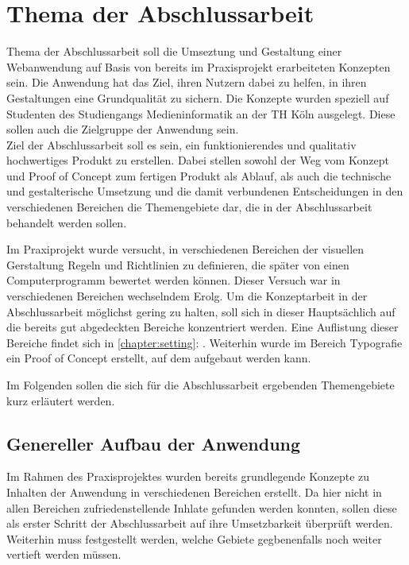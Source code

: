 \section{Thema der Abschlussarbeit}
Thema der Abschlussarbeit soll die Umseztung und Gestaltung einer Webanwendung auf Basis von bereits im Praxisprojekt erarbeiteten Konzepten sein.
Die Anwendung hat das Ziel, ihren Nutzern dabei zu helfen, in ihren Gestaltungen eine Grundqualität zu sichern. Die Konzepte wurden speziell auf Studenten des Studiengangs Medieninformatik an der TH Köln ausgelegt. Diese sollen auch die Zielgruppe der Anwendung sein. \\
Ziel der Abschlussarbeit soll es sein, ein funktionierendes und qualitativ hochwertiges Produkt zu erstellen.
Dabei stellen sowohl der Weg vom Konzept und Proof of Concept zum fertigen Produkt als Ablauf, als auch die technische und gestalterische Umsetzung und die damit verbundenen Entscheidungen in den verschiedenen Bereichen die Themengebiete dar, die in der Abschlussarbeit behandelt werden sollen.

Im Praxiprojekt wurde versucht, in verschiedenen Bereichen der visuellen Gerstaltung Regeln und Richtlinien zu definieren, die später von einen Computerprogramm bewertet werden können. Dieser Versuch war in verschiedenen Bereichen wechselndem Erolg. Um die Konzeptarbeit in der Abschlussarbeit möglichst gering zu halten, soll sich in dieser Hauptsächlich auf die bereits gut abgedeckten Bereiche konzentriert werden. Eine Auflistung dieser Bereiche findet sich in \autoref{chapter:setting}: \textit{}.
Weiterhin wurde im Bereich Typografie ein Proof of Concept erstellt, auf dem aufgebaut werden kann.

Im Folgenden sollen die sich für die Abschlussarbeit ergebenden Themengebiete kurz erläutert werden.

\subsection{Genereller Aufbau der Anwendung}
\label{chapter:setting}
Im Rahmen des Praxisprojektes wurden bereits grundlegende Konzepte zu Inhalten der Anwendung in verschiedenen Bereichen erstellt. Da hier nicht in allen Bereichen zufriedenstellende Inhlate gefunden werden konnten, sollen diese als erster Schritt der Abschlussarbeit auf ihre Umsetzbarkeit überprüft werden. Weiterhin muss festgestellt werden, welche Gebiete gegbenenfalls noch weiter vertieft werden müssen.

